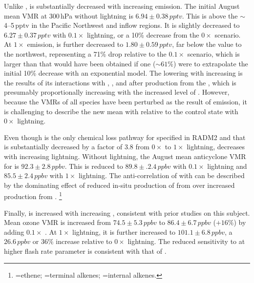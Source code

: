Unlike ,  is substantially decreased with increasing {\lnox} emission. The initial August mean VMR at 300\,\unit{hPa} without
lightning is $6.94\pm0.38\,\unit{pptv}$. This is above the $\sim$4--5\,\unit{pptv} in the Pacific Northwest and inflow regions. It is slightly decreased
to $6.27\pm0.37\,\unit{pptv}$ with $0.1\times$ lightning, or a 10\% decrease from the $0\times$ scenario. At $1\times$ {\lnox} emission, 
is further decreased to $1.80\pm0.59\,\unit{pptv}$, far below the value to the northwest, representing a 71\% drop relative to the $0.1\times$ scenario,
which is larger than that would have been obtained if one ($\sim61\%$) were to extrapolate the initial 10\% decrease with an exponential model.
The lowering  with increasing  is the results of its interactions with , , and  after production
from the , which is presumably proportionally increasing with the increased level of . However, because the VMRs
of all species have been perturbed as the result of {\lnox} emission, it is challenging to describe the new mean  with {\lnox} relative to
the control state with $0\times$ lightning.

Even though  is the only chemical loss pathway for  specified in RADM2 and that  is
substantially decreased by a factor of 3.8 from $0\times$ to $1\times$ lightning,  decreases with increasing lightning. Without lightning, the
August mean anticyclone VMR for  is $92.3\pm2.8\,\unit{ppbv}$. This is reduced to $89.8\pm.2.4\,\unit{ppbv}$ with $0.1\times$ lightning
and $85.5\pm2.4\,\unit{ppbv}$ with $1\times$ lightning. The anti-correlation of  with {\lnox} can be described by the dominating effect of
reduced in-situ production of  from  over increased production from .
\footnote{=ethene; =terminal alkenes; =internal alkenes.}

Finally,  is increased with increasing {\lnox}, consistent with prior studies on this subject. Mean ozone VMR
is increased from $74.5\pm5.3\,\unit{ppbv}$ to $86.4\pm6.7\,\unit{ppbv}$ ($+16\%$) by adding $0.1\times$ {\lnox}. At $1\times$ lightning, it
is further increased to $101.1\pm6.8\,\unit{ppbv}$, a $26.6\,\unit{ppbv}$ or $36\%$ increase relative to $0\times$ lightning. The reduced sensitivity
to {\lnox} at higher flash rate parameter is consistent with that of .

